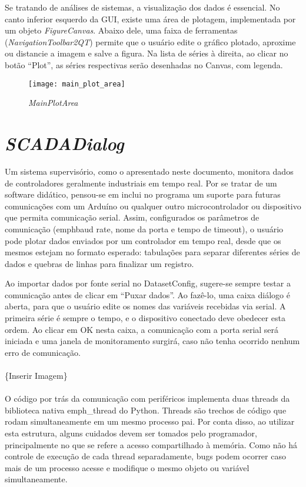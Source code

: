 Se tratando de análises de sistemas, a visualização dos dados é essencial. No canto inferior esquerdo da GUI, existe uma área de plotagem, implementada por um objeto \emph{FigureCanvas}. Abaixo dele, uma faixa de ferramentas (\emph{NavigationToolbar2QT}) permite que o usuário edite o gráfico plotado, aproxime ou distancie a imagem e salve a figura. Na lista de séries à direita, ao clicar no botão “Plot”, as séries respectivas serão desenhadas no Canvas, com legenda.

\begin{figure}
	\centering
	\texttt{[image: main\_plot\_area]}
	\caption{\emph{MainPlotArea}}
	\label{img_main_plot_area}
\end{figure}

\section{\emph{SCADADialog}}

Um sistema supervisório, como o apresentado neste documento, monitora dados de controladores geralmente industriais em tempo real. Por se tratar de um software didático, pensou-se em inclui no programa um suporte para futuras comunicações com um Arduíno ou qualquer outro microcontrolador ou dispositivo que permita comunicação serial. Assim, configurados os parâmetros de comunicação (emph{baud rate}, nome da porta e tempo de timeout), o usuário pode plotar dados enviados por um controlador em tempo real, desde que os mesmos estejam no formato esperado: tabulações para separar diferentes séries de dados e quebras de linhas para finalizar um registro.

Ao importar dados por fonte serial no DatasetConfig, sugere-se sempre testar a comunicação antes de clicar em “Puxar dados”. Ao fazê-lo, uma caixa diálogo é aberta, para que o usuário edite os nomes das variáveis recebidas via serial. A primeira série é sempre o tempo, e o dispositivo conectado deve obedecer esta ordem. Ao clicar em OK nesta caixa, a comunicação com a porta serial será iniciada e uma janela de monitoramento surgirá, caso não tenha ocorrido nenhum erro de comunicação.
\\\\
\{Inserir Imagem\}
\\\\
O código por trás da comunicação com periféricos implementa duas threads da biblioteca nativa emph{\_thread} do Python. Threads são trechos de código que rodam simultaneamente em um mesmo processo pai. Por conta disso, ao utilizar esta estrutura, alguns cuidados devem ser tomados pelo programador, principalmente no que se refere a acesso compartilhado à memória. Como não há controle de execução de cada thread separadamente, bugs podem ocorrer caso mais de um processo acesse e modifique o mesmo objeto ou variável simultaneamente.

